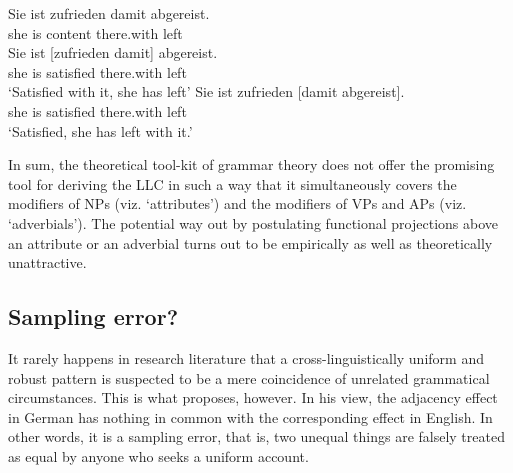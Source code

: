\documentclass[output=paper
  ,nobabel
  ,uniformtopskip %
]{langscibook}
\begin{document}




\eal
\ex 
\gll Sie ist zufrieden damit abgereist.\\
     she is  content   there.with left\\
\ex 
\gll Sie ist [zufrieden damit] abgereist.\\
     she is  \spacebr{}satisfied there.with left \\
\glt `Satisfied with it, she has left'
\ex
\gll Sie ist zufrieden [damit abgereist].\\
     she is  satisfied \spacebr{}there.with left\\     
\glt `Satisfied, she has left with it.'
\zl

\noindent
In sum, the theoretical tool-kit of grammar theory does not offer the promising tool for deriving the LLC in such a way that it simultaneously covers the modifiers of NPs (viz. `attributes') and the modifiers of VPs and APs (viz. `adverbials'). The potential way out by postulating functional projections above an attribute or an adverbial turns out to be empirically as well as theoretically unattractive.

\subsection{Sampling error?}\label{subsec-error}

It rarely happens in research literature that a cross-linguistically uniform and robust pattern is suspected to be a mere coincidence of unrelated grammatical circumstances. This is what \citet{Hinterhoelzl2016} proposes, however. In his view, the adjacency effect in German has nothing in common with the corresponding effect in English. In other words, it is a sampling error, that is, two unequal things are falsely treated as equal by anyone who seeks a uniform account.
\end{document}
